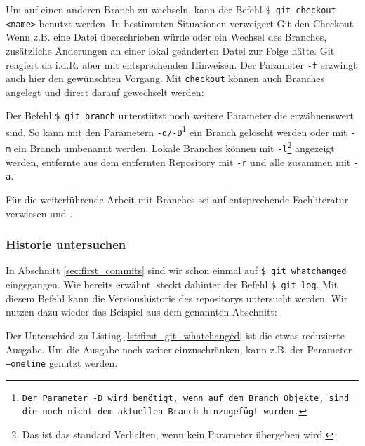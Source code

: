 
Um auf einen anderen Branch zu wechseln, kann der Befehl \texttt{\$ git checkout
<name>} benutzt werden. In bestimmten Situationen verweigert Git den Checkout.
Wenn z.B. eine Datei überschrieben würde oder ein Wechsel des Branches, zusätzliche
Änderungen an einer lokal geänderten Datei zur Folge hätte. Git reagiert da
i.d.R. aber mit entsprechenden Hinweisen. Der Parameter \texttt{-f} erzwingt
auch hier den gewünschten Vorgang. Mit \texttt{checkout} können auch Branches
angelegt und direct darauf gewechselt werden:


Der Befehl \texttt{\$ git branch} unterstützt noch weitere Parameter die
erwähnenswert sind. So kann mit den Parametern
\texttt{-d/-D}\footnote{\texttt{Der Parameter -D wird benötigt, wenn auf dem
Branch Objekte, sind die noch nicht dem aktuellen Branch hinzugefügt
wurden.\cite[67]{gitosp}}} ein Branch gelöscht werden oder mit \texttt{-m} ein
Branch umbenannt werden. Lokale Branches können mit \texttt{-l}\footnote{Das
ist das standard Verhalten, wenn kein Parameter übergeben wird.} angezeigt
werden, entfernte aus dem entfernten Repository mit \texttt{-r} und alle
zusammen mit \texttt{-a}.\cite[65-67]{gitosp}

Für die weiterführende Arbeit mit Branches sei auf entsprechende Fachliteratur
verwiesen \cite[388-389, 408-415]{cd} und \cite[56-88]{progit}.

\subsubsection{Historie untersuchen}\label{sec:arch}
In Abschnitt \ref{sec:first_commits} sind wir schon einmal auf \texttt{\$ git
whatchanged} eingegangen. Wie bereits erwähnt, steckt dahinter der Befehl
\texttt{\$ git log}. Mit diesem Befehl kann die Versionshistorie des
\glspl{repository} untersucht werden. Wir nutzen dazu wieder das Beispiel aus
dem genannten Abschnitt:


Der Unterschied zu Listing \ref{lst:first_git_whatchanged} ist die etwas
reduzierte Ausgabe. Um die Ausgabe noch weiter einzuschränken, kann z.B. der
Parameter \texttt{--oneline} genutzt werden.


